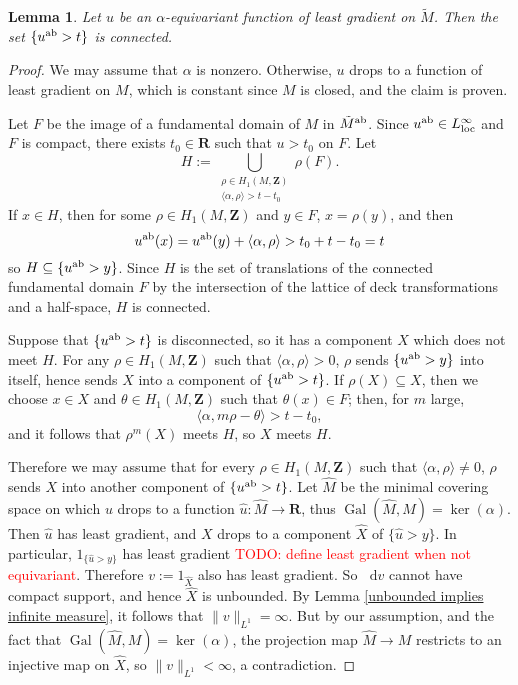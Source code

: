 \documentclass[reqno,11pt]{amsart}
\newcommand{\ZZ}{\mathbf{Z}}
\newcommand{\RR}{\mathbf{R}}
\newcommand*\dif{\mathop{}\!\mathrm{d}}
\DeclareMathOperator{\Gal}{Gal}
\newcommand{\loc}{\mathrm{loc}}
\newtheorem{lemma}[theorem]{Lemma}
\theoremstyle{definition}
\numberwithin{equation}{section}
\newcommand\todo[1]{\textcolor{red}{TODO: #1}}
\begin{document}
\begin{lemma}\label{superlevel sets are connected}
Let $u$ be an $\alpha$-equivariant function of least gradient on $\tilde M$.
Then the set $\{u^{\rm ab} > t\}$ is connected.
\end{lemma}
\begin{proof}
We may assume that $\alpha$ is nonzero.
Otherwise, $u$ drops to a function of least gradient on $M$, which is constant since $M$ is closed, and the claim is proven.

Let $F$ be the image of a fundamental domain of $M$ in $\tilde M^{\rm ab}$.
Since $u^{\rm ab} \in L^\infty_\loc$ \cite[Theorem 4.3]{Gorny20} and $F$ is compact, there exists $t_0 \in \RR$ such that $u > t_0$ on $F$.
Let 
$$H := \bigcup_{\substack{\rho \in H_1(M, \ZZ) \\ \langle \alpha, \rho\rangle > t - t_0}} \rho(F).$$
If $x \in H$, then for some $\rho \in H_1(M, \ZZ)$ and $y \in F$, $x = \rho(y)$, and then 
$$u^{\rm ab}(x) = u^{\rm ab}(y) + \langle \alpha, \rho\rangle > t_0 + t - t_0 = t$$
so $H \subseteq \{u^{\rm ab} > y\}$.
Since $H$ is the set of translations of the connected fundamental domain $F$ by the intersection of the lattice of deck transformations and a half-space, $H$ is connected.

Suppose that $\{u^{\rm ab} > t\}$ is disconnected, so it has a component $X$ which does not meet $H$.
For any $\rho \in H_1(M, \ZZ)$ such that $\langle \alpha, \rho\rangle > 0$, $\rho$ sends $\{u^{\rm ab} > y\}$ into itself, hence sends $X$ into a component of $\{u^{\rm ab} > t\}$.
If $\rho(X) \subseteq X$, then we choose $x \in X$ and $\theta \in H_1(M, \ZZ)$ such that $\theta(x) \in F$; then, for $m$ large, 
$$\langle \alpha, m\rho - \theta\rangle > t - t_0,$$
and it follows that $\rho^m(X)$ meets $H$, so $X$ meets $H$.

Therefore we may assume that for every $\rho \in H_1(M, \ZZ)$ such that $\langle \alpha, \rho\rangle \neq 0$, $\rho$ sends $X$ into another component of $\{u^{\rm ab} > t\}$.
Let $\hat M$ be the minimal covering space on which $u$ drops to a function $\hat u: \hat M \to \RR$, thus $\Gal(\hat M, M) = \ker(\alpha)$.
Then $\hat u$ has least gradient, and $X$ drops to a component $\hat X$ of $\{\hat u > y\}$.
In particular, $1_{\{\hat u > y\}}$ has least gradient \cite[Theorem 1]{BOMBIERI1969} \todo{define least gradient when not equivariant}.
Therefore $v := 1_{\hat X}$ also has least gradient.
So $\dif v$ cannot have compact support, and hence $\hat X$ is unbounded.
By Lemma \ref{unbounded implies infinite measure}, it follows that $\|v\|_{L^1} = \infty$.
But by our assumption, and the fact that $\Gal(\hat M, M) = \ker(\alpha)$, the projection map $\hat M \to M$ restricts to an injective map on $\hat X$, so $\|v\|_{L^1} < \infty$, a contradiction.
\end{proof}
\end{document}

